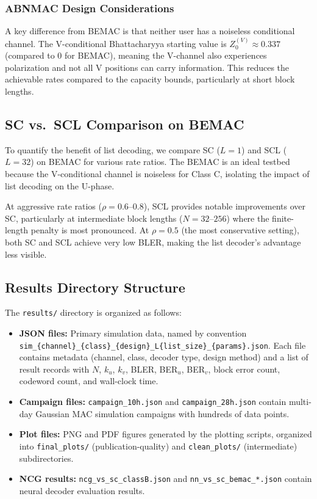 \documentclass[11pt,a4paper]{article}
\begin{document}
\subsubsection{ABNMAC Design Considerations}

A key difference from BEMAC is that neither user has a noiseless conditional
channel. The V-conditional Bhattacharyya starting value is
$Z_0^{(V)} \approx 0.337$ (compared to 0 for BEMAC), meaning the V-channel
also experiences polarization and not all V positions can carry information.
This reduces the achievable rates compared to the capacity bounds,
particularly at short block lengths.

\subsection{SC vs.\ SCL Comparison on BEMAC}

To quantify the benefit of list decoding, we compare SC ($L = 1$) and SCL
($L = 32$) on BEMAC for various rate ratios. The BEMAC is an ideal
testbed because the V-conditional channel is noiseless for Class C,
isolating the impact of list decoding on the U-phase.

At aggressive rate ratios ($\rho = 0.6$--$0.8$), SCL provides notable
improvements over SC, particularly at intermediate block lengths
($N = 32$--$256$) where the finite-length penalty is most pronounced.
At $\rho = 0.5$ (the most conservative setting), both SC and SCL achieve
very low BLER, making the list decoder's advantage less visible.

\subsection{Results Directory Structure}

The \texttt{results/} directory is organized as follows:
\begin{itemize}
  \item \textbf{JSON files:} Primary simulation data, named by convention
        \texttt{sim\_\{channel\}\_\{class\}\_\{design\}\_L\{list\_size\}\_\{params\}.json}.
        Each file contains metadata (channel, class, decoder type, design method)
        and a list of result records with $N$, $k_u$, $k_v$, BLER, BER$_u$,
        BER$_v$, block error count, codeword count, and wall-clock time.

  \item \textbf{Campaign files:} \texttt{campaign\_10h.json} and
        \texttt{campaign\_28h.json} contain multi-day Gaussian MAC simulation
        campaigns with hundreds of data points.

  \item \textbf{Plot files:} PNG and PDF figures generated by the plotting
        scripts, organized into \texttt{final\_plots/} (publication-quality)
        and \texttt{clean\_plots/} (intermediate) subdirectories.

  \item \textbf{NCG results:} \texttt{ncg\_vs\_sc\_classB.json} and
        \texttt{nn\_vs\_sc\_bemac\_*.json} contain neural decoder evaluation
        results.
\end{itemize}
\end{document}
